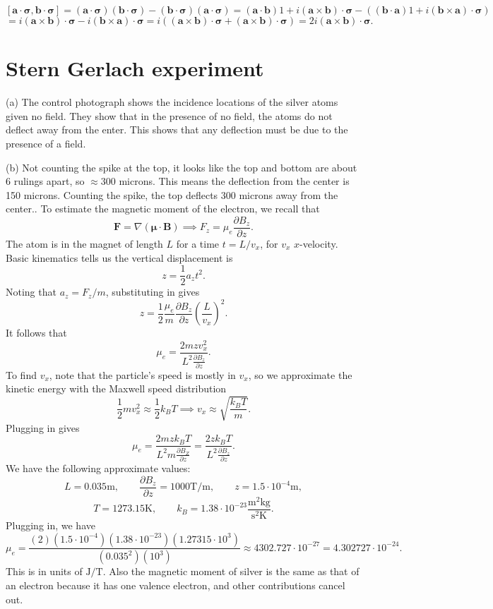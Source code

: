 \documentclass[11pt, letterpaper]{article}
\begin{document}
\[
	\left[ \mathbf{a} \cdot \boldsymbol{\sigma} ,\mathbf{b} \cdot \boldsymbol{\sigma}  \right] =(\mathbf{a} \cdot \boldsymbol{\sigma} )(\mathbf{b} \cdot \boldsymbol{\sigma} )-(\mathbf{b} \cdot \boldsymbol{\sigma} )(\mathbf{a} \cdot \boldsymbol{\sigma} )=(\mathbf{a} \cdot \mathbf{b} )1+i(\mathbf{a} \times \mathbf{b} )\cdot \boldsymbol{\sigma} - \left( (\mathbf{b} \cdot \mathbf{a} )1+i(\mathbf{b} \times \mathbf{a} )\cdot \boldsymbol{\sigma}  \right) 
\]
\[
	=i(\mathbf{a}\times \mathbf{b} )\cdot \boldsymbol{\sigma} -i(\mathbf{b} \times \mathbf{a} )\cdot \boldsymbol{\sigma} =i\left( (\mathbf{a} \times \mathbf{b} )\cdot \boldsymbol{\sigma} +(\mathbf{a} \times \mathbf{b} )\cdot \boldsymbol{\sigma}  \right) =2i(\mathbf{a} \times \mathbf{b} )\cdot \boldsymbol{\sigma} 
.\]


\section{Stern Gerlach experiment}

(a) The control photograph shows the incidence locations of the silver atoms given no field. They show that in the presence of no field, the atoms do not deflect away from the enter. This shows that any deflection must be due to the presence of a field.

(b) Not counting the spike at the top, it looks like the top and bottom are about 6 rulings apart, so $\approx 300$ microns. This means the deflection from the center is 150 microns. Counting the spike, the top deflects 300 microns away from the center.. To estimate the magnetic moment of the electron, we recall that
\[
	\mathbf{F} =\nabla (\boldsymbol{\mu} \cdot \mathbf{B} )\implies F_z=\mu _e \frac{\partial B_z}{\partial z}
.\]
The atom is in the magnet of length $L$ for a time $t = L/v_x$, for $v_x$ $x$-velocity. Basic kinematics tells us the vertical displacement is
\[
	z = \frac{1}{2} a_zt^2
.\]
Noting that $a_z = F_z / m$, substituting in gives
\[
	z = \frac{1}{2} \frac{\mu _e}{m} \frac{\partial B_z}{\partial z} \left( \frac{L}{v_x}  \right) ^2
.\]
It follows that
\[
	\mu _e = \frac{2mzv_x^2}{L^2\frac{\partial B_z}{\partial z} } 
.\]
To find $v_x$, note that the particle's speed is mostly in $v_x$, so we approximate the kinetic energy with the Maxwell speed distribution
\[
	\frac{1}{2} mv_x^2 \approx  \frac{1}{2} k_BT \implies v_x \approx \sqrt{\frac{k_BT}{m} } 
.\]
Plugging in gives
\[
	\mu _e = \frac{2mzk_BT}{L^2m \frac{\partial B_Z}{\partial z} } =\frac{2zk_BT}{L^2 \frac{\partial B_z}{\partial z} } 
.\]
We have the following approximate values:
\[
L = 0.035\mathrm{m} ,\qquad \frac{\partial B_z}{\partial z} =1000\mathrm{T}/\mathrm{m} ,\qquad z = 1.5\cdot 10^{-4} \mathrm{m} ,
\]
\[
	T=1273.15\mathrm{K} ,\qquad k_B=1.38\cdot 10^{-23} \frac{\mathrm{m} ^2\mathrm{kg} }{\mathrm{s} ^2\mathrm{K} } 
.\]
Plugging in, we have
\[
	\mu _e = \frac{\left( 2 \right) \left( 1.5\cdot 10^{-4}  \right) \left( 1.38\cdot 10^{-23}  \right) \left( 1.27315\cdot 10^{3}  \right) }{\left( 0.035^2 \right) \left( 10^3 \right) } \approx 4302.727 \cdot 10^{-27} =4.302727 \cdot 10^{-24} 
.\]
This is in units of $\mathrm{J} /\mathrm{T}$. Also the magnetic moment of silver is the same as that of an electron because it has one valence electron, and other contributions cancel out.
\end{document}
